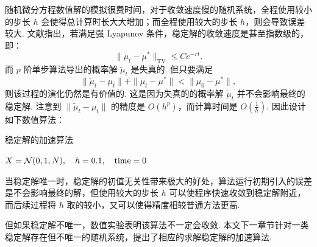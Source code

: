 随机微分方程数值解的模拟很费时间，对于收敛速度慢的随机系统，全程使用较小的步长 $h$ 会使得总计算时长大大增加；而全程使用较大的步长 $h$，则会导致误差较大. 文献\cite{Fokker_Planck}指出，若满足强 Lyapunov 条件，稳定解的收敛速度是甚至指数级的，即：
\[
	\| \mu_t -\mu^* \|_{\operatorname{TV}} \le Ce^{-rt}. 
\]
而 $p$ 阶单步算法导出的概率解 $\tilde \mu_t$ 是失真的. 但只要满足
\[
	\| \tilde{ \mu} _t - \mu_t \|  + \| \mu_t -\mu^* \|  < \| \mu_0 -\mu^* \| ,
\]
则该过程的演化仍然是有价值的. 这是因为失真的的概率解 $\tilde\mu_t$ 并不会影响最终的稳定解. 
注意到 $\| \tilde \mu_t - \mu_t \| $ 的精度是 $O(h^p)$，而计算时间是 $O(\frac1h)$. 因此设计如下数值算法：

\begin{algorithm}[!htbp]
	\caption{稳定解的加速算法}%
	\LinesNumbered %
	$X = \mathcal N(0,1,N),\quad h=0.1,\quad \rm{time} = 0$\;
\end{algorithm}

当稳定解唯一时，稳定解的初值无关性带来极大的好处，算法运行初期引入的误差是不会影响最终的解，但使用较大的步长 $h$ 可以使程序快速收敛到稳定解附近，而后续过程将 $h$ 取的较小，又可以使得精度相较普通方法更高. 


但如果稳定解不唯一，数值实验表明该算法不一定会收敛. 本文下一章节针对一类稳定解存在但不唯一的随机系统，提出了相应的求解稳定解的加速算法. 














